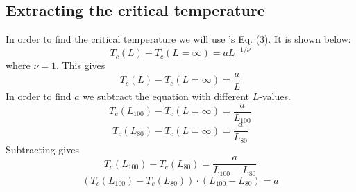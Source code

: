 \documentclass{article}
\begin{document}
\subsection{Extracting the critical temperature} \label{sec:criticaltemp}

In order to find the critical temperature we will use \cite{task}'s Eq. (3). It is shown below:
$$T_c(L)-T_c(L=\infty)=aL^{-1/\nu}$$
where $\nu=1$. This gives
$$T_c(L)-T_c(L=\infty)=\frac{a}{L}$$
In order to find $a$ we subtract the equation with different $L$-values.
$$T_c(L_{100})-T_c(L=\infty)=\frac{a}{L_{100}}$$
$$T_c(L_{80})-T_c(L=\infty)=\frac{a}{L_{80}}$$
Subtracting gives
$$T_c(L_{100})-T_c(L_{80})=\frac{a}{L_{100}-L_{80}}$$
$$(T_c(L_{100})-T_c(L_{80}))\cdot(L_{100}-L_{80})=a$$ \label{eq:finding-a}





\end{document}
